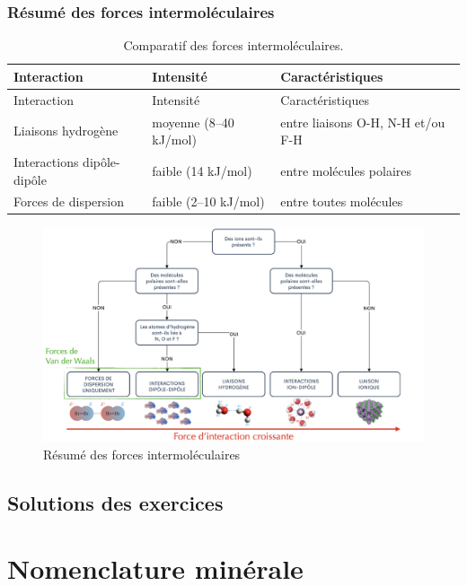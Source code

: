 \documentclass[
  11pt,
  french,
  a4paper,
  openany]{book}
\begin{document}
\hypertarget{ruxe9sumuxe9-des-forces-intermoluxe9culaires}{%
\subsection{Résumé des forces intermoléculaires}\label{ruxe9sumuxe9-des-forces-intermoluxe9culaires}}

\begin{longtable}[]{@{}lll@{}}
\caption{\label{tab:comparatif-intermoleculaires} Comparatif des forces intermoléculaires.}\tabularnewline
\toprule
Interaction & Intensité & Caractéristiques\tabularnewline
\midrule
\endfirsthead
\toprule
Interaction & Intensité & Caractéristiques\tabularnewline
\midrule
\endhead
Liaisons hydrogène & moyenne (8--40 kJ/mol) & entre liaisons O-H, N-H et/ou F-H\tabularnewline
Interactions dipôle-dipôle & faible (14 kJ/mol) & entre molécules polaires\tabularnewline
Forces de dispersion & faible (2--10 kJ/mol) & entre toutes molécules\tabularnewline
\bottomrule
\end{longtable}

\newpage

\begin{figure}

{\centering \includegraphics[width=1\linewidth]{images/forces-intermoleculaires-resume} 

}

\caption{Résumé des forces intermoléculaires}\label{fig:forces-intermoleculaires-resume}
\end{figure}

\section{Solutions des exercices} \shipoutAnswer

\hypertarget{nomenclature-minuxe9rale}{%
\chapter{Nomenclature minérale}\label{nomenclature-minuxe9rale}}
\end{document}
